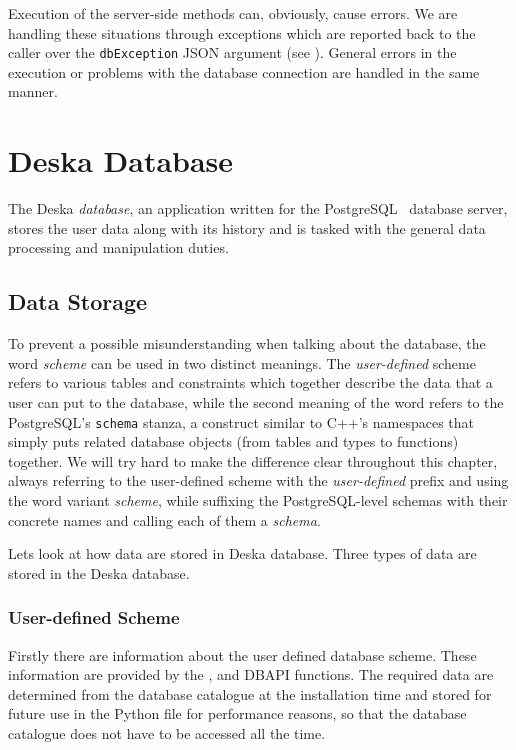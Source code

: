 \documentclass[deska]{subfiles}
\begin{document}
Execution of the server-side methods can, obviously, cause errors.  We are handling these situations through exceptions
which are reported back to the caller over the {\tt dbException} JSON argument (see ).
General errors in the execution or problems with the database connection are handled in the same manner.

\section{Deska Database}

The Deska {\em database}, an application written for the PostgreSQL~\cite{postgresql} database server, stores the user
data along with its history and is tasked with the general data processing and manipulation duties.

\subsection{Data Storage}
To prevent a possible misunderstanding when talking about the database, the word {\em scheme} can be used in two
distinct meanings.  The {\em user-defined} scheme refers to various tables and constraints which together describe the
data that a user can put to the database, while the second meaning of the word refers to the PostgreSQL's {\tt schema}
stanza, a construct similar to C++'s namespaces that simply puts related database objects (from tables and types to
functions) together.  We will try hard to make the difference clear throughout this chapter, always referring to the
user-defined scheme with the {\em user-defined} prefix and using the word variant {\em scheme}, while suffixing the
PostgreSQL-level schemas with their concrete names and calling each of them a {\em schema}.

Lets look at how data are stored in Deska database. Three types of data are stored in the Deska database.

\subsubsection{User-defined Scheme}
Firstly there are information about the user defined database scheme.  These information are provided by the
,  and  DBAPI functions.  The required
data are determined from the database catalogue at the installation time and stored for future use in the
 Python file for performance reasons, so that the database catalogue does not have to be accessed all
the time.
\end{document}
